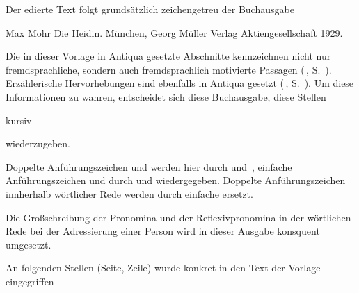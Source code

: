 


Der edierte Text folgt grundsätzlich zeichengetreu der Buchausgabe\dopp{}

Max Mohr\dopp{} Die Heidin. München, Georg Müller Verlag Aktiengesellschaft
1929.

Die in dieser Vorlage in Antiqua gesetzte Abschnitte kennzeichnen nicht nur
fremdsprachliche, sondern auch fremdsprachlich motivierte Passagen
(\,, S.~\pageref{lS47-1}). Erzählerische
Hervorhebungen sind ebenfalls in Antiqua gesetzt (\,,
S.~\pageref{lS48-1}).
Um diese Informationen zu wahren, entscheidet sich diese Buchausgabe,
diese Stellen \begin{it}kursiv\end{it} wiederzugeben.

Doppelte Anführungszeichen \frqq{} und \flqq{} werden hier durch
\flqq{} und \frqq{}\,, einfache Anführungszeichen \glq{} und \grq{}
durch \flq{} und \frq{} wiedergegeben. Doppelte Anführungszeichen
innherhalb wörtlicher Rede werden durch einfache ersetzt.

Die Großschreibung der Pronomina und der Reflexivpronomina in der wörtlichen Rede
bei der Adressierung einer Person wird in dieser Ausgabe konsquent
umgesetzt. 

An folgenden Stellen (Seite, Zeile) wurde konkret in den Text der
Vorlage eingegriffen\dopp{}

\theendnotes
